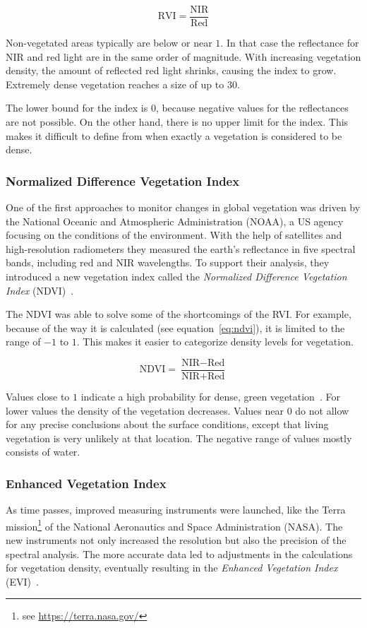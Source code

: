 \begin{equation}
    \text{RVI} = \frac{\text{NIR}}{\text{Red}}
    \label{eq:rvi}
\end{equation}

Non-vegetated areas typically are below or near $1$. In that case the reflectance for NIR and red light are in the same order of magnitude. With increasing vegetation density, the amount of reflected red light shrinks, causing the index to grow. Extremely dense vegetation reaches a size of up to $30$.

The lower bound for the index is $0$, because negative values for the reflectances are not possible. On the other hand, there is no upper limit for the index. This makes it difficult to define from when exactly a vegetation is considered to be dense.

\subsubsection{Normalized Difference Vegetation Index}
One of the first approaches to monitor changes in global vegetation was driven by the National Oceanic and Atmospheric Administration (NOAA), a US agency focusing on the conditions of the environment. With the help of satellites and high-resolution radiometers they measured the earth's reflectance in five spectral bands, including red and NIR wavelengths. To support their analysis, they introduced a new vegetation index called the \emph{Normalized Difference Vegetation Index} (NDVI)~\cite{measuring_vegetation00}.

The NDVI was able to solve some of the shortcomings of the RVI. For example, because of the way it is calculated (see equation~\ref{eq:ndvi}), it is limited to the range of $-1$ to $1$. This makes it easier to categorize density levels for vegetation.

\begin{equation}
    \text{NDVI} = \frac{\text{NIR}-\text{Red}}{\text{NIR}+\text{Red}}
    \label{eq:ndvi}
\end{equation}

Values close to $1$ indicate a high probability for dense, green vegetation~\cite{gisg_ndvi20}. For lower values the density of the vegetation decreases. Values near $0$ do not allow for any precise conclusions about the surface conditions, except that living vegetation is very unlikely at that location. The negative range of values mostly consists of water.

\subsubsection{Enhanced Vegetation Index}
As time passes, improved measuring instruments were launched, like the Terra mission\footnote{see \url{https://terra.nasa.gov/}} of the National Aeronautics and Space Administration (NASA). The new instruments not only increased the resolution but also the precision of the spectral analysis. The more accurate data led to adjustments in the calculations for vegetation density, eventually resulting in the \emph{Enhanced Vegetation Index} (EVI)~\cite{modis2002}.

